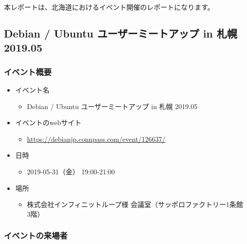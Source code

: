 \documentclass[mingoth,a4paper]{jsarticle}
\begin{document}
本レポートは、北海道におけるイベント開催のレポートになります。


\subsection{Debian / Ubuntu ユーザーミートアップ in 札幌 2019.05}


\subsubsection{イベント概要}

\begin{itemize}
\item イベント名
  \begin{itemize}
  \item Debian / Ubuntu ユーザーミートアップ in 札幌 2019.05
  \end{itemize}
\end{itemize}

\begin{itemize}
\item イベントのwebサイト
  \begin{itemize}
  \item \url{https://debianjp.connpass.com/event/126637/}
  \end{itemize}
\end{itemize}

\begin{itemize}
\item 日時
  \begin{itemize}
  \item 2019-05-31（金） 19:00-21:00
  \end{itemize}
\end{itemize}

\begin{itemize}
\item 場所
  \begin{itemize}
  \item 株式会社インフィニットループ様 会議室（サッポロファクトリー1条館　3階）
  \end{itemize}
\end{itemize}


\subsubsection{イベントの来場者}
\end{document}
